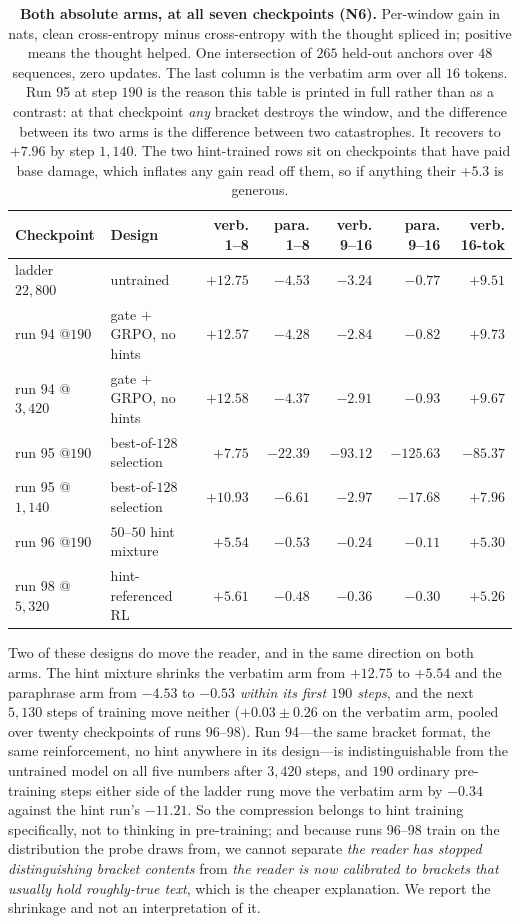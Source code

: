 \documentclass{article} %
\begin{document}
\begin{table}[t]
\centering
\small
\caption{\textbf{Both absolute arms, at all seven checkpoints (N6).} Per-window gain in nats, clean cross-entropy minus cross-entropy with the thought spliced in; positive means the thought helped. One intersection of $265$ held-out anchors over $48$ sequences, zero updates. The last column is the verbatim arm over all $16$ tokens. Run 95 at step $190$ is the reason this table is printed in full rather than as a contrast: at that checkpoint \emph{any} bracket destroys the window, and the difference between its two arms is the difference between two catastrophes. It recovers to $+7.96$ by step $1{,}140$. The two hint-trained rows sit on checkpoints that have paid base damage, which inflates any gain read off them, so if anything their $+5.3$ is generous.}
\label{tab:absarms}
\begin{tabular}{@{}llrrrrr@{}}
\toprule
Checkpoint & Design & verb. 1--8 & para. 1--8 & verb. 9--16 & para. 9--16 & verb. 16-tok \\
\midrule
ladder $22{,}800$ & untrained & $+12.75$ & $-4.53$ & $-3.24$ & $-0.77$ & $+9.51$ \\
run 94 @$190$ & gate ${+}$ GRPO, no hints & $+12.57$ & $-4.28$ & $-2.84$ & $-0.82$ & $+9.73$ \\
run 94 @$3{,}420$ & gate ${+}$ GRPO, no hints & $+12.58$ & $-4.37$ & $-2.91$ & $-0.93$ & $+9.67$ \\
run 95 @$190$ & best-of-$128$ selection & $+7.75$ & $-22.39$ & $-93.12$ & $-125.63$ & $-85.37$ \\
run 95 @$1{,}140$ & best-of-$128$ selection & $+10.93$ & $-6.61$ & $-2.97$ & $-17.68$ & $+7.96$ \\
run 96 @$190$ & $50$--$50$ hint mixture & $+5.54$ & $-0.53$ & $-0.24$ & $-0.11$ & $+5.30$ \\
run 98 @$5{,}320$ & hint-referenced RL & $+5.61$ & $-0.48$ & $-0.36$ & $-0.30$ & $+5.26$ \\
\bottomrule
\end{tabular}
\end{table}

Two of these designs do move the reader, and in the same direction on both arms. The hint mixture shrinks the verbatim arm from $+12.75$ to $+5.54$ and the paraphrase arm from $-4.53$ to $-0.53$ \emph{within its first $190$ steps}, and the next $5{,}130$ steps of training move neither ($+0.03 \pm 0.26$ on the verbatim arm, pooled over twenty checkpoints of runs 96--98). Run 94---the same bracket format, the same reinforcement, no hint anywhere in its design---is indistinguishable from the untrained model on all five numbers after $3{,}420$ steps, and $190$ ordinary pre-training steps either side of the ladder rung move the verbatim arm by $-0.34$ against the hint run's $-11.21$. So the compression belongs to hint training specifically, not to thinking in pre-training; and because runs 96--98 train on the distribution the probe draws from, we cannot separate \emph{the reader has stopped distinguishing bracket contents} from \emph{the reader is now calibrated to brackets that usually hold roughly-true text}, which is the cheaper explanation. We report the shrinkage and not an interpretation of it.
\end{document}
